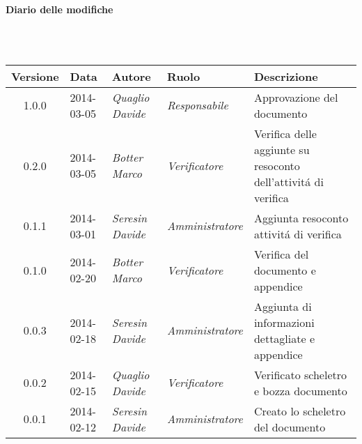 \noindent\begin{Large}\textbf{Diario delle modifiche}\end{Large}\\
\\
\begin{small}
\begin{tabular}{|c|p{1.8cm}|p{2.8cm}|p{2.8cm}|p{3.5cm}|}
\hline
Versione & Data & Autore & Ruolo & Descrizione \\
\hline
\hline
1.0.0 & 2014-03-05 & 
\textit{Quaglio Davide} &
\textit{Responsabile} &  Approvazione del documento\\
\hline
0.2.0 & 2014-03-05 & 
\textit{Botter Marco} &
\textit{Verificatore} &  Verifica delle aggiunte su resoconto dell'attivit\'a di verifica\\
\hline
0.1.1 & 2014-03-01 & 
\textit{Seresin Davide} &
\textit{Amministratore} &  Aggiunta resoconto attivit\'a di verifica\\
\hline
0.1.0 & 2014-02-20 & 
\textit{Botter Marco} &
\textit{Verificatore} &  Verifica del documento e appendice\\
\hline
0.0.3 & 2014-02-18 & 
\textit{Seresin Davide} &
\textit{Amministratore} &  Aggiunta di informazioni dettagliate e appendice\\
\hline
0.0.2 & 2014-02-15 & 
\textit{Quaglio Davide} &
\textit{Verificatore} &  Verificato scheletro e bozza documento\\
\hline
0.0.1 & 2014-02-12 & 
\textit{Seresin Davide} &
\textit{Amministratore} &  Creato lo scheletro del documento\\
\hline
\end{tabular}\\
\end{small}